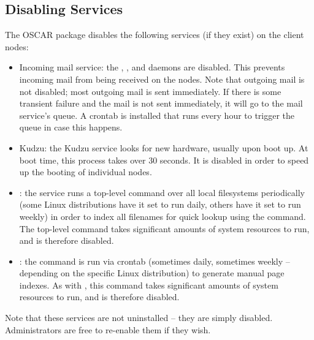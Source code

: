 %
%
%

\subsection{Disabling Services}

The  OSCAR package disables the following
services (if they exist) on the client nodes:

\begin{itemize}
\item Incoming mail service: the , , and
   daemons are disabled.  This prevents incoming mail
  from being received on the nodes.  Note that outgoing mail is not
  disabled; most outgoing mail is sent immediately.  If there is some
  transient failure and the mail is not sent immediately, it will go
  to the mail service's queue.  A  crontab is
  installed that runs every hour to trigger the queue in case this
  happens.

\item Kudzu: the Kudzu service looks for new hardware, usually upon
  boot up.  At boot time, this process takes over 30 seconds.  It is
  disabled in order to speed up the booting of individual nodes.
  
\item {}: the  service runs a top-level
   command over all local filesystems periodically (some
  Linux distributions have it set to run daily, others have it set to
  run weekly) in order to index all filenames for quick lookup using
  the  command.  The top-level  command takes
  significant amounts of system resources to run, and is therefore
  disabled.
  
\item {}: the  command is run via
  crontab (sometimes daily, sometimes weekly -- depending on the
  specific Linux distribution) to generate manual page indexes.  As
  with , this command takes significant amounts of system
  resources to run, and is therefore disabled.
\end{itemize}

Note that these services are not uninstalled -- they are simply
disabled.  Administrators are free to re-enable them if they wish.
